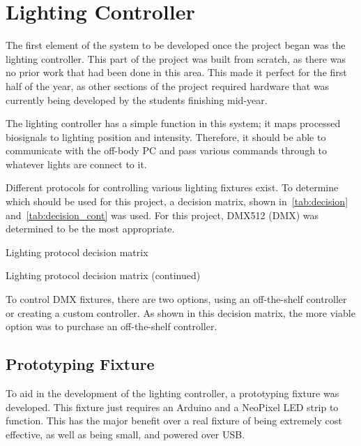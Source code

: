 \chapter{Lighting Controller}
The first element of the system to be developed once the project began was the lighting controller.
This part of the project was built from scratch, as there was no prior work that had been done in this area.
This made it perfect for the first half of the year,
as other sections of the project required hardware that was currently being developed by the students finishing mid-year.

The lighting controller has a simple function in this system; it maps processed biosignals to lighting position and intensity.
Therefore, it should be able to communicate with the off-body PC and pass various commands through to whatever lights are connect to it.

Different protocols for controlling various lighting fixtures exist.
To determine which should be used for this project, a decision matrix, shown in~\autoref{tab:decision} and~\autoref{tab:decision_cont} was used.
For this project, DMX512 (DMX) was determined to be the most appropriate.

\begin{table}[!ht]
    \caption{Lighting protocol decision matrix}\label{tab:decision}
    \centering
    
\end{table}

\begin{table}[!ht]
    \caption{Lighting protocol decision matrix (continued)}\label{tab:decision_cont}
    \centering
    
\end{table}

To control DMX fixtures, there are two options, using an off-the-shelf controller or creating a custom controller.
As shown in this decision matrix, the more viable option was to purchase an off-the-shelf controller.

\section{Prototyping Fixture}
To aid in the development of the lighting controller, a prototyping fixture was developed.
This fixture just requires an Arduino and a NeoPixel LED strip to function.
This has the major benefit over a real fixture of being extremely cost effective, as well as being small, and powered over USB.


